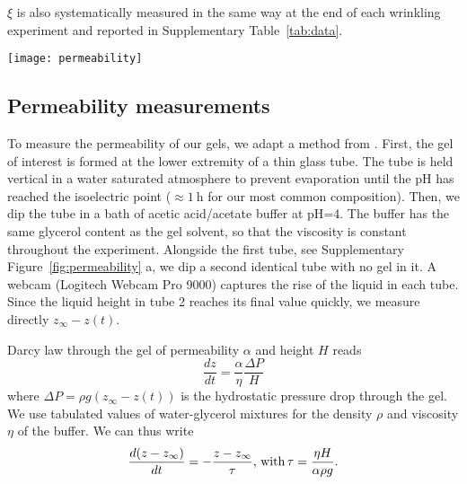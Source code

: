 \documentclass[twocolumn,superscriptaddress,showpacs,preprintnumbers,
amsmath,amssymb,prl]{revtex4-1}
\begin{document}
$\xi$ is also systematically measured in the same way at the end of each wrinkling experiment and reported in Supplementary Table~\ref{tab:data}. %


\begin{figure*}%
	\texttt{[image: permeability]}%
	\caption{Permeability measurements. (a) Schematic representation of the experimental set up. (b-c) Evolution of the height of the interface in tube 1 relative to the final height in tube 2. The black line is the best exponential fit $Ae^{-t/\tau}$. (b) Gel is 4\%w casein, 4\%w GDL in water, $H=\SI{2.3}{\milli\metre}$ and $\tau=\SI{57}{\minute}$. (c) Same as (b) for a 50\%w glycerol--water mixture, $H=\SI{4}{\milli\metre}$ and $\tau=\SI{100}{\hour}$.}%
	\label{fig:permeability}%
\end{figure*}
\subsection*{Permeability measurements}

To measure the permeability of our gels, we adapt a method from \cite{VanDijk1986}. First, the gel of interest is formed at the lower extremity of a thin glass tube. The tube is held vertical in a water saturated atmosphere to prevent evaporation until the pH has reached the isoelectric point ($\approx\SI{1}{\hour}$ for our most common composition). Then, we dip the tube in a bath of acetic acid/acetate buffer at pH=4. The buffer has the same glycerol content as the gel solvent, so that the viscosity is constant throughout the experiment. Alongside the first tube, see Supplementary Figure~\ref{fig:permeability} a, we dip a second identical tube with no gel in it. A webcam (Logitech Webcam Pro 9000) captures the rise of the liquid in each tube. Since the liquid height in tube 2 reaches its final value quickly, we measure directly $z_\infty-z(t)$.

Darcy law through the gel of permeability $\alpha$ and height $H$ reads 
\begin{equation}
\frac{dz}{dt} = \frac{\alpha}{\eta}\frac{\Delta P}{H}
\end{equation}
where $\Delta P=\rho g(z_\infty-z(t))$ is the hydrostatic pressure drop through the gel. We use tabulated values of water-glycerol mixtures for the density $\rho$ and viscosity $\eta$ of the buffer. We can thus write
\begin{equation}
\frac{d(z-z_\infty)}{dt} = -\frac{z-z_\infty}{\tau}\text{, with\,} \tau = \frac{\eta H}{\alpha \rho g}.
\end{equation}
\end{document}
